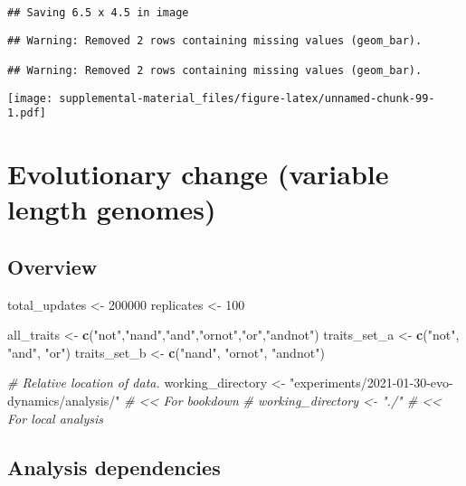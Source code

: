 \documentclass[]{book}
\newenvironment{Shaded}{\begin{snugshade}}{\end{snugshade}}
\newcommand{\CommentTok}[1]{\textcolor[rgb]{0.56,0.35,0.01}{\textit{#1}}}
\newcommand{\DecValTok}[1]{\textcolor[rgb]{0.00,0.00,0.81}{#1}}
\newcommand{\KeywordTok}[1]{\textcolor[rgb]{0.13,0.29,0.53}{\textbf{#1}}}
\newcommand{\NormalTok}[1]{#1}
\newcommand{\StringTok}[1]{\textcolor[rgb]{0.31,0.60,0.02}{#1}}
\begin{document}
\begin{verbatim}
## Saving 6.5 x 4.5 in image
\end{verbatim}

\begin{verbatim}
## Warning: Removed 2 rows containing missing values (geom_bar).

## Warning: Removed 2 rows containing missing values (geom_bar).
\end{verbatim}

\texttt{[image: supplemental-material\_files/figure-latex/unnamed-chunk-99-1.pdf]}

\hypertarget{evolutionary-change-variable-length-genomes}{%
\chapter{Evolutionary change (variable length genomes)}\label{evolutionary-change-variable-length-genomes}}

\hypertarget{overview-5}{%
\section{Overview}\label{overview-5}}

\begin{Shaded}
\begin{Highlighting}[]
\NormalTok{total_updates <-}\StringTok{ }\DecValTok{200000}
\NormalTok{replicates <-}\StringTok{ }\DecValTok{100}

\NormalTok{all_traits <-}\StringTok{ }\KeywordTok{c}\NormalTok{(}\StringTok{"not"}\NormalTok{,}\StringTok{"nand"}\NormalTok{,}\StringTok{"and"}\NormalTok{,}\StringTok{"ornot"}\NormalTok{,}\StringTok{"or"}\NormalTok{,}\StringTok{"andnot"}\NormalTok{)}
\NormalTok{traits_set_a <-}\StringTok{ }\KeywordTok{c}\NormalTok{(}\StringTok{"not"}\NormalTok{, }\StringTok{"and"}\NormalTok{, }\StringTok{"or"}\NormalTok{)}
\NormalTok{traits_set_b <-}\StringTok{ }\KeywordTok{c}\NormalTok{(}\StringTok{"nand"}\NormalTok{, }\StringTok{"ornot"}\NormalTok{, }\StringTok{"andnot"}\NormalTok{)}

\CommentTok{# Relative location of data.}
\NormalTok{working_directory <-}\StringTok{ "experiments/2021-01-30-evo-dynamics/analysis/"} \CommentTok{# << For bookdown}
\CommentTok{# working_directory <- "./"                                              # << For local analysis}
\end{Highlighting}
\end{Shaded}

\hypertarget{analysis-dependencies-5}{%
\section{Analysis dependencies}\label{analysis-dependencies-5}}
\end{document}
